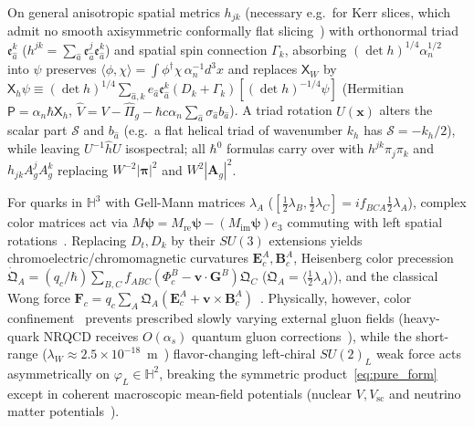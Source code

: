 \documentclass[aps,prd,onecolumn,tightenlines,nofootinbib,notitlepage,10pt,floatfix]{revtex4-2}
\theoremstyle{indentedtheorem}
\begin{document}
On general anisotropic spatial metrics $h_{jk}$ (necessary e.g.\ for Kerr slices, which admit no smooth axisymmetric conformally flat slicing~\citep{GaratPrice2000Nonexistence}) with orthonormal triad $\mathfrak{e}_{\hat{a}}^k$ ($h^{jk}=\sum_{\hat{a}}\mathfrak{e}_{\hat{a}}^j\mathfrak{e}_{\hat{a}}^k$) and spatial spin connection $\Gamma_k$, absorbing $(\det h)^{1/4}\alpha_n^{1/2}$ into $\psi$ preserves $\langle\phi,\chi\rangle=\int\phi^\dagger\chi\,\alpha_n^{-1}d^3x$ and replaces $\mathsf{X}_W$ by $\mathsf{X}_h\psi\equiv(\det h)^{1/4}\sum_{\hat{a},k}e_{\hat{a}}\mathfrak{e}_{\hat{a}}^k(D_k+\Gamma_k)[(\det h)^{-1/4}\psi]$ (Hermitian $\mathsf{P}=\alpha_n\hbar\mathsf{X}_h$, $\hat{V}=V-\hat{\Pi}_g-\hbar c\alpha_n\sum_{\hat{a}}\sigma_{\hat{a}}b_{\hat{a}}$). A triad rotation $U(\mathbf{x})$ alters the scalar part $\mathcal{S}$ and $b_{\hat{a}}$ (e.g.\ a flat helical triad of wavenumber $k_h$ has $\mathcal{S}=-k_h/2$), while leaving $U^{-1}\hat{h}U$ isospectral; all $\hbar^0$ formulas carry over with $h^{jk}\pi_j\pi_k$ and $h_{jk}A_g^j A_g^k$ replacing $W^{-2}|\boldsymbol{\pi}|^2$ and $W^2|\mathbf{A}_g|^2$.

For quarks in $\mathbb{H}^3$ with Gell-Mann matrices $\lambda_A$ ($[\tfrac{1}{2}\lambda_B,\tfrac{1}{2}\lambda_C]=if_{BCA}\tfrac{1}{2}\lambda_A$), complex color matrices act via $M\boldsymbol{\psi}=M_\text{re}\boldsymbol{\psi}-(M_\text{im}\boldsymbol{\psi})e_3$ commuting with left spatial rotations~\citep{FritzschGellMannLeutwyler1973Advantages}. Replacing $D_t,D_k$ by their $SU(3)$ extensions yields chromoelectric/chromomagnetic curvatures $\mathbf{E}_c^A,\mathbf{B}_c^A$, Heisenberg color precession $\dot{\mathfrak{Q}}_A=(q_c/\hbar)\sum_{B,C}f_{ABC}(\Phi_c^B-\mathbf{v}\cdot\mathbf{G}^B)\mathfrak{Q}_C$ ($\mathfrak{Q}_A=\langle\tfrac{1}{2}\lambda_A\rangle$), and the classical Wong force $\mathbf{F}_c=q_c\sum_A\mathfrak{Q}_A(\mathbf{E}_c^A+\mathbf{v}\times\mathbf{B}_c^A)$~\citep{Wong1970Field}. Physically, however, color confinement~\citep{Wilson1974Confinement} prevents prescribed slowly varying external gluon fields (heavy-quark NRQCD receives $O(\alpha_s)$ quantum gluon corrections~\citep{CaswellLepage1986Effective,BodwinBraatenLepage1995Rigorous}), while the short-range ($\lambda_W\approx 2.5\times 10^{-18}$~m~\citep{Yukawa1935Interaction,PDG2022Review}) flavor-changing left-chiral $SU(2)_L$ weak force acts asymmetrically on $\varphi_L\in\mathbb{H}^2$, breaking the symmetric product~\eqref{eq:pure_form} except in coherent macroscopic mean-field potentials (nuclear $V,V_\text{sc}$ and neutrino matter potentials~\citep{Walecka1974Theory,Wolfenstein1978Neutrino,BouchiatBouchiat1974Parity}).
\end{document}
